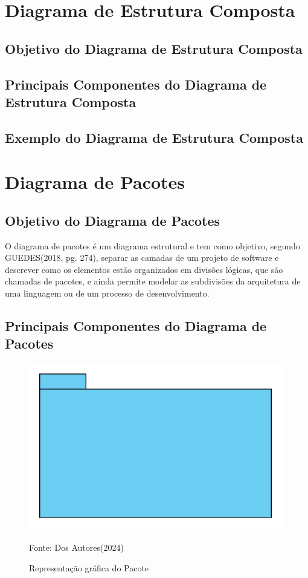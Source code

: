 \documentclass[12pt,openright,oneside,a4paper,
	chapter=TITLE,
	section=TITLE,
	english,brazil]{abntex2}
\begin{document}
\chapter{Diagrama de Estrutura Composta}

\section{Objetivo do Diagrama de Estrutura Composta}

\section{Principais Componentes do Diagrama de Estrutura Composta}

\section{Exemplo do Diagrama de Estrutura Composta}

\chapter{Diagrama de Pacotes}

\section{Objetivo do Diagrama de Pacotes}

O diagrama de pacotes é um diagrama estrutural e tem como objetivo, segundo GUEDES(2018, pg. 274), separar as camadas de um projeto de software e descrever como os elementos estão organizados em divisões lógicas, que são chamadas de pacotes, e ainda permite modelar as subdivisões da arquitetura de uma linguagem ou de um processo de desenvolvimento.

\section{Principais Componentes do Diagrama de Pacotes}

\begin{figure}
	\caption{Representação gráfica do Pacote}
	\centering
	\includegraphics[scale=0.5]{img/Pacote.png}
	\\

	\label{ElementoPacote}
	\footnotesize\raggedright Fonte: Dos Autores(2024)
\end{figure}
\end{document}
